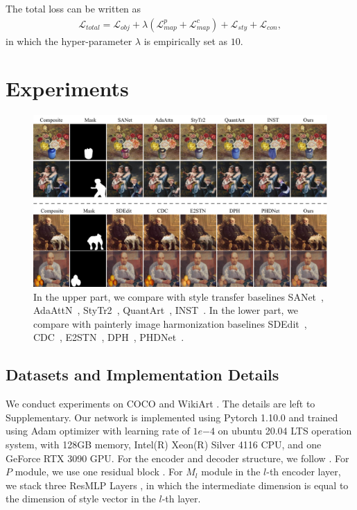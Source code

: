 \documentclass[letterpaper]{article} %
\begin{document}
The total loss can be written as
\begin{eqnarray} \label{eqn:total_loss}
\mathcal{L}_{total} = \mathcal{L}_{obj} \!+\! \lambda (\mathcal{L}_{map}^p \!+\! \mathcal{L}_{map}^c) \!+\!  \mathcal{L}_{sty} \!+\!  \mathcal{L}_{con}, %
\end{eqnarray}
in which the hyper-parameter $\lambda$ is empirically set as $10$.

\section{Experiments}

\begin{figure}[t]
\centering
\includegraphics[width=1.0\linewidth]{figures/baseline_main.jpg}
\caption{In the upper part, we compare with style transfer baselines SANet~\cite{park2019arbitrary}, AdaAttN~\cite{liu2021adaattn}, StyTr2~\cite{deng2022stytr2}, QuantArt~\cite{quantart}, INST~\cite{inst}.
In the lower part, we compare with painterly image harmonization baselines SDEdit~\cite{sdedit}, CDC~\cite{cdc}, E2STN~\cite{peng2019element}, DPH~\cite{luan2018deep}, PHDNet~\cite{cao2022painterly}.
 }
\label{fig:baseline_main}
\end{figure}



\subsection{Datasets and Implementation Details} \label{sec:imp_detail}

We conduct experiments on COCO \cite{lin2014microsoft} and WikiArt \cite{nichol2016painter}. The details are left to Supplementary.
Our network is implemented using Pytorch 1.10.0 and trained using Adam optimizer with learning rate of $1e{-4}$ on ubuntu 20.04 LTS operation system, with 128GB memory, Intel(R) Xeon(R) Silver 4116 CPU, and one GeForce RTX 3090 GPU. For the encoder and decoder structure, we follow \cite{cao2022painterly}. For $P$ module, we use one residual block \cite{he2016deep}. For $M_l$ module in the $l$-th encoder layer, we stack three ResMLP Layers \cite{TouvronBCCEGIJSVJ23}, in which the intermediate dimension is equal to the dimension of style vector in the $l$-th layer.
\end{document}
